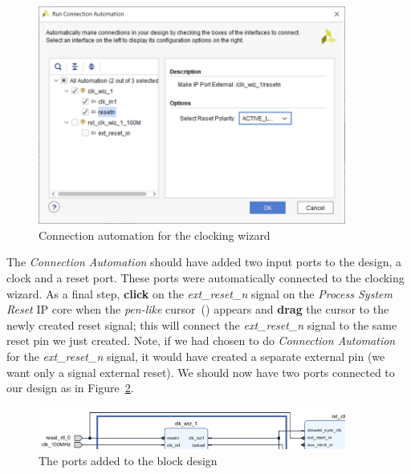 \documentclass[11pt]{article}
\begin{document}
\begin{figure}[h]
    \centering
    \includegraphics[width=0.9\textwidth]{images/conn_auto_clock.png}
    \caption{Connection automation for the clocking wizard}
    \label{fig:conn_auto_clock}
\end{figure}

The \textit{Connection Automation} should have added two input ports to the design, a clock and a reset port. These ports were automatically connected to the clocking wizard. As a final step, \textbf{click} on the \textit{ext\_reset\_n} signal on the \textit{Process System Reset} IP core when the \textit{pen-like} cursor~() appears and \textbf{drag} the cursor to the newly created reset signal; this will connect the \textit{ext\_reset\_n} signal to the same reset pin we just created. Note, if we had chosen to do \textit{Connection Automation} for the \textit{ext\_reset\_n} signal, it would have created a separate external pin (we want only a signal external reset). We should now have two ports connected to our design as in Figure~\ref{fig:added_reset_conns}.

\begin{figure}[h]
    \centering
    \includegraphics[width=0.9\textwidth]{images/added_reset_conns.png}
    \caption{The ports added to the block design}
    \label{fig:added_reset_conns}
\end{figure}
\end{document}
